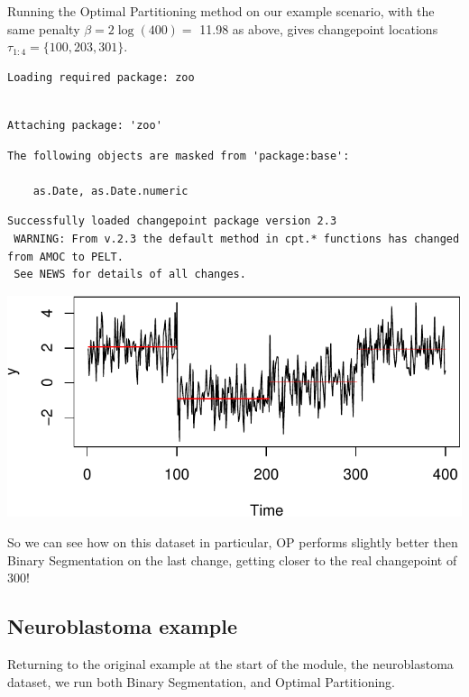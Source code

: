 \documentclass[
  letterpaper,
  DIV=11,
  numbers=noendperiod]{scrreprt}
\begin{document}
Running the Optimal Partitioning method on our example scenario, with
the same penalty \(\beta = 2 \log(400) =\) 11.98 as above, gives
changepoint locations \(\tau_{1:4} = \{100, 203, 301\}\).

\begin{verbatim}
Loading required package: zoo
\end{verbatim}

\begin{verbatim}

Attaching package: 'zoo'
\end{verbatim}

\begin{verbatim}
The following objects are masked from 'package:base':

    as.Date, as.Date.numeric
\end{verbatim}

\begin{verbatim}
Successfully loaded changepoint package version 2.3
 WARNING: From v.2.3 the default method in cpt.* functions has changed from AMOC to PELT.
 See NEWS for details of all changes.
\end{verbatim}

\includegraphics{3_multiple_changes_files/figure-pdf/unnamed-chunk-16-1.pdf}

So we can see how on this dataset in particular, OP performs slightly
better then Binary Segmentation on the last change, getting closer to
the real changepoint of 300!

\subsection{Neuroblastoma example}\label{neuroblastoma-example}

Returning to the original example at the start of the module, the
neuroblastoma dataset, we run both Binary Segmentation, and Optimal
Partitioning.
\end{document}
